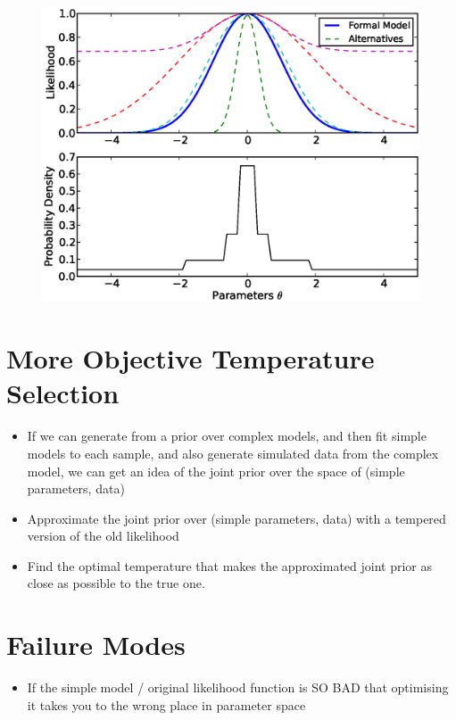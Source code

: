 \documentclass[letterpaper, 11pt]{article}
\begin{document}
\begin{figure}
\begin{center}
\includegraphics[scale=0.7]{nested.eps}
\end{center}
\end{figure}

\section{More Objective Temperature Selection}
\begin{itemize}
\item If we can generate from a prior over complex models, and then fit simple models to each sample, and also generate simulated data from the complex model, we can get an idea of the joint prior over the space of (simple parameters, data)\\
\item Approximate the joint prior over (simple parameters, data) with a tempered version of the old likelihood \\
\item Find the optimal temperature that makes the approximated joint prior as close as possible to the true one.
\end{itemize}

\section{Failure Modes}
\begin{itemize}
\item If the simple model / original likelihood function is SO BAD that optimising it takes you to the wrong place in parameter space
\end{itemize}
\end{document}
